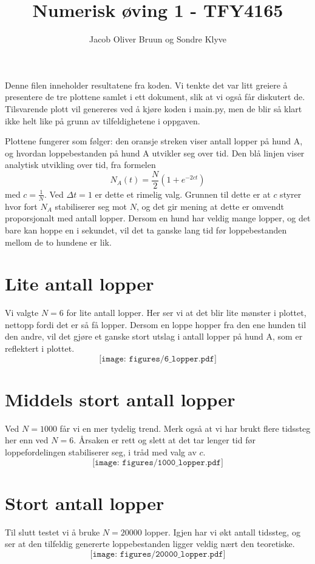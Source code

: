 \documentclass[a4paper, 11pt]{article}
\title{Numerisk øving 1 - TFY4165}
\author{Jacob Oliver Bruun og Sondre Klyve}
\begin{document}
\maketitle
Denne filen inneholder resultatene fra koden. Vi tenkte det var litt greiere å presentere de tre plottene samlet i ett dokument, slik at vi også får diskutert de. Tilsvarende plott vil genereres ved å kjøre koden i main.py, men de blir så klart ikke helt like på grunn av tilfeldighetene i oppgaven.

Plottene fungerer som følger: den oransje streken viser antall lopper på hund A, og hvordan loppebestanden på hund A utvikler seg over tid. Den blå linjen viser analytisk utvikling over tid, fra formelen
\begin{equation}
  N_A(t) = \frac{N}{2}\left(1+e^{-2ct}\right)
\end{equation}
med $c= \frac{1}{N}$. Ved $\Delta t=1$ er dette et rimelig valg. Grunnen til dette er at $c$ styrer hvor fort $N_A$ stabiliserer seg mot $N$, og det gir mening at dette er omvendt proporsjonalt med antall lopper. Dersom en hund har veldig mange lopper, og det bare kan hoppe en i sekundet, vil det ta ganske lang tid før loppebestanden mellom de to hundene er lik. 
\section*{Lite antall lopper}
Vi valgte $N=6$ for lite antall lopper. Her ser vi at det blir lite mønster i plottet, nettopp fordi det er så få lopper. Dersom en loppe hopper fra den ene hunden til den andre, vil det gjøre et ganske stort utslag i antall lopper på hund A, som er reflektert i plottet.
\[
  \texttt{[image: figures/6\_lopper.pdf]}
\]
\section*{Middels stort antall lopper}
Ved $N=1000$ får vi en mer tydelig trend. Merk også at vi har brukt flere tidssteg her enn ved $N=6$. Årsaken er rett og slett at det tar lenger tid før loppefordelingen stabiliserer seg, i tråd med valg av $c$.  
\[
  \texttt{[image: figures/1000\_lopper.pdf]}
\]
\section*{Stort antall lopper}
Til slutt testet vi å bruke $N=20000$ lopper. Igjen har vi økt antall tidssteg, og ser at den tilfeldig genererte loppebestanden ligger veldig nært den teoretiske. 
\[
  \texttt{[image: figures/20000\_lopper.pdf]}
\]
\end{document}
